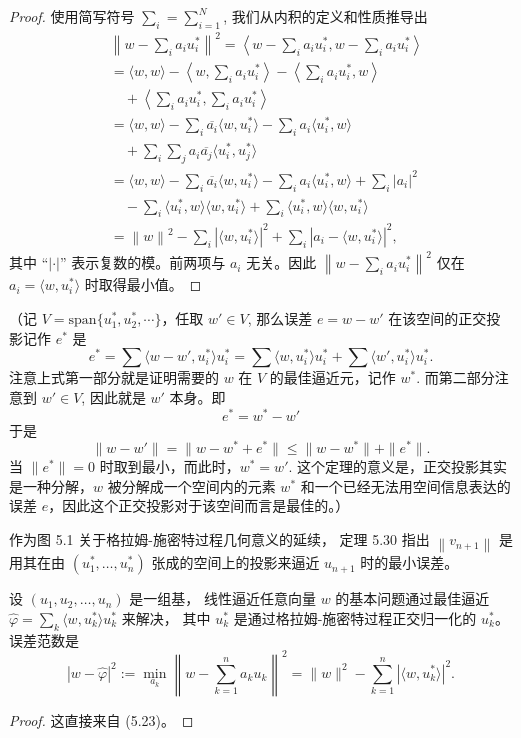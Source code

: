 \documentclass[a4paper]{ctexart}
\newcommand{\hl}[1]
{\noindent {\bf {#1}}}
\begin{document}
{\begin{proof}
使用简写符号 \(\sum_i = \sum_{i = 1}^{N}\), 我们从内积的定义和性质推导出
\begin{align*}
  &\left\| w - \sum_i a_i u_i^* \right\|^2 = \left\langle w - \sum_i a_i u_i^*, w - \sum_i a_i u_i^* \right\rangle \\
  &= \langle w, w \rangle - \left\langle w, \sum_i a_i u_i^* \right\rangle - \left\langle \sum_i a_i u_i^*, w \right\rangle \\
  &\quad + \left\langle \sum_i a_i u_i^*, \sum_i a_i u_i^* \right\rangle \\
  &= \langle w, w \rangle - \sum_i \overline{a_i} \langle w, u_i^* \rangle - \sum_i a_i \langle u_i^*, w \rangle \\
  &\quad + \sum_i \sum_j a_i \overline{a_j} \langle u_i^*, u_j^* \rangle \\
  &= \langle w, w \rangle - \sum_i \overline{a_i} \langle w, u_i^* \rangle - \sum_i a_i \langle u_i^*, w \rangle + \sum_i |a_i|^2 \\
  &\quad - \sum_i \langle u_i^*, w \rangle \langle w, u_i^* \rangle + \sum_i \langle u_i^*, w \rangle \langle w, u_i^* \rangle \\
  &= \left\| w \right\|^2 - \sum_i \left| \langle w, u_i^* \rangle \right|^2 + \sum_i \left| a_i - \langle w, u_i^* \rangle \right|^2,
\end{align*}
其中 ``$|\cdot|$'' 表示复数的模。前两项与 \(a_i\) 无关。因此 \(\left\| w - \sum_i a_i u_i^* \right\|^2\) 仅在 \(a_i = \langle w, u_i^* \rangle\) 
时取得最小值。
\end{proof}
（记 $V = \mathrm{span}\{u^*_1, u^*_2, \cdots\}$，任取 $w' \in V$, 那么误差 $e = w - w'$ 在该空间的正交投影记作 $e^*$ 是
$$
e^* = \sum \langle w - w', u_i^* \rangle u_i^* =  \sum \langle w, u_i^* \rangle u_i^* + \sum \langle w', u_i^* \rangle u_i^*.
$$
注意上式第一部分就是证明需要的 $w$ 在 $V$ 的最佳逼近元，记作 $w^*$. 而第二部分注意到 $w' \in V$, 因此就是 $w'$ 本身。即
$$
e^* = w^* - w'
$$
于是 
$$
\|w - w'\| = \|w - w^* + e^*\| \leq \|w - w^*\| + \|e^*\|.
$$
当 $\|e^*\| = 0$ 时取到最小，而此时，$w^* = w'$. 这个定理的意义是，正交投影其实是一种分解，$w$ 被分解成一个空间内的元素 $w^*$ 
和一个已经无法用空间信息表达的误差 $e$，因此这个正交投影对于该空间而言是最佳的。）

\hl{备注 5.15} 作为图 5.1 关于格拉姆-施密特过程几何意义的延续，
定理 5.30 指出 \(\left\|v_{n+1}\right\|\) 是用其在由 \((u_1^*, \ldots, u_n^*)\) 张成的空间上的投影来逼近 \(u_{n+1}\) 时的最小误差。

\hl{推论 5.31} 设 \((u_1, u_2, \ldots, u_n)\) 是一组基，
线性逼近任意向量 \(w\) 的基本问题通过最佳逼近 \(\hat{\varphi} = \sum_{k} \langle w, u_k^* \rangle u_k^*\) 来解决，
其中 \(u_k^{*}\) 是通过格拉姆-施密特过程正交归一化的 \(u_k^*\)。误差范数是
\[
  |w - \hat{\varphi}|^2 := \min_{a_k} \left\|w - \sum_{k=1}^n a_k u_k\right\|^2 = \|w\|^2 - \sum_{k=1}^n \left|\langle w, u_k^* \rangle\right|^2.
\]
\begin{proof}
这直接来自 (5.23)。  
\end{proof}

}
\end{document}
